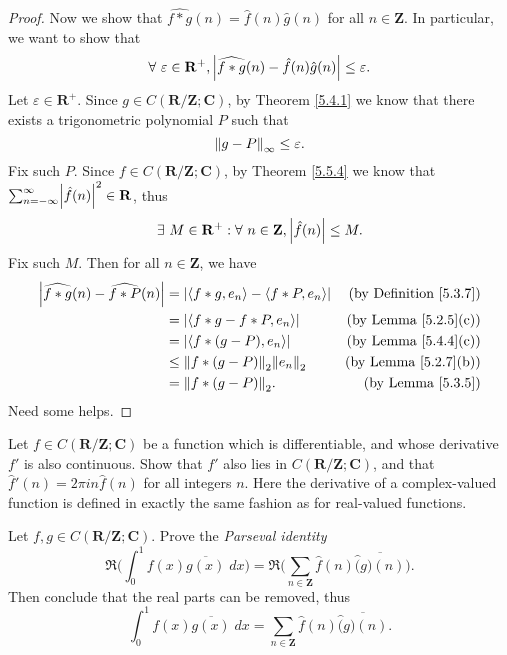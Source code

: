 \begin{proof}
    Now we show that \(\widehat{f * g}(n) = \hat{f}(n) \hat{g}(n)\) for all \(n \in \mathbf{Z}\).
    In particular, we want to show that
    \[
        \forall\ \varepsilon \in \mathbf{R}^+, \abs*{\widehat{f * g}(n) - \hat{f}(n) \hat{g}(n)} \leq \varepsilon.
    \]
    Let \(\varepsilon \in \mathbf{R}^+\).
    Since \(g \in C(\mathbf{R} / \mathbf{Z} ; \mathbf{C})\), by Theorem \ref{5.4.1} we know that there exists a trigonometric polynomial \(P\) such that
    \[
        \norm*{g - P}_{\infty} \leq \varepsilon.
    \]
    Fix such \(P\).
    Since \(f \in C(\mathbf{R} / \mathbf{Z} ; \mathbf{C})\), by Theorem \ref{5.5.4} we know that \(\sum_{n = -\infty}^\infty \abs*{\hat{f}(n)}^2 \in \mathbf{R}\), thus
    \[
        \exists\ M \in \mathbf{R}^+ : \forall\ n \in \mathbf{Z}, \abs*{\hat{f}(n)} \leq M.
    \]
    Fix such \(M\).
    Then for all \(n \in \mathbf{Z}\), we have
    \begin{align*}
        \abs*{\widehat{f * g}(n) - \widehat{f * P}(n)} & = \abs*{\inner*{f * g, e_n} - \inner*{f * P, e_n}} & \text{(by Definition \ref{5.3.7})} \\
                                                       & = \abs*{\inner*{f * g - f * P, e_n}}               & \text{(by Lemma \ref{5.2.5}(c))}   \\
                                                       & = \abs*{\inner*{f * (g - P), e_n}}                 & \text{(by Lemma \ref{5.4.4}(c))}   \\
                                                       & \leq \norm*{f * (g - P)}_2 \norm*{e_n}_2           & \text{(by Lemma \ref{5.2.7}(b))}   \\
                                                       & = \norm*{f * (g - P)}_2.                           & \text{(by Lemma \ref{5.3.5})}
    \end{align*}
    Need some helps.
\end{proof}

\begin{exercise}\label{ex 5.5.4}
    Let \(f \in C(\mathbf{R} / \mathbf{Z} ; \mathbf{C})\) be a function which is differentiable, and whose derivative \(f'\) is also continuous.
    Show that \(f'\) also lies in \(C(\mathbf{R} / \mathbf{Z} ; \mathbf{C})\), and that \(\hat{f}'(n) = 2 \pi i n \hat{f}(n)\) for all integers \(n\).
    Here the derivative of a complex-valued function is defined in exactly the same fashion as for real-valued functions.
\end{exercise}

\begin{exercise}\label{ex 5.5.5}
    Let \(f, g \in C(\mathbf{R} / \mathbf{Z} ; \mathbf{C})\).
    Prove the \emph{Parseval identity}
    \[
        \Re\bigg(\int_0^1 f(x) \overline{g(x)} \; dx\bigg) = \Re\bigg(\sum_{n \in \mathbf{Z}} \hat{f}(n) \overline{\hat(g)(n)}\bigg).
    \]
    Then conclude that the real parts can be removed, thus
    \[
        \int_0^1 f(x) \overline{g(x)} \; dx = \sum_{n \in \mathbf{Z}} \hat{f}(n) \overline{\hat(g)(n)}.
    \]
\end{exercise}

